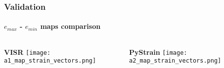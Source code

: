 \begin{frame}[t]
  \frametitle{Validation}
  \framesubtitle{$e_{max}$ - $e_{min}$ maps comparison}
  \label{ch3:data}
  \begin{columns}
    \begin{column}{0.5\textwidth}
      \begin{center}
        \textbf{VISR} 
        \texttt{[image: a1\_map\_strain\_vectors.png]}   
      \end{center}
    \end{column}
    \begin{column}{0.5\textwidth}
      \begin{center}
        \textbf{PyStrain} 
        \texttt{[image: a2\_map\_strain\_vectors.png]}     
      \end{center}
    \end{column}
  \end{columns}

\end{frame}
\note{}

%       
%       
% 

